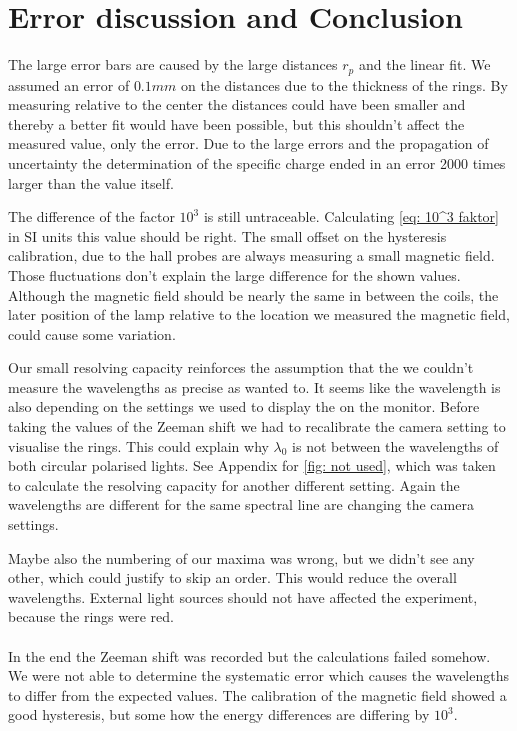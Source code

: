 \documentclass[]{article}
\begin{document}
\newpage
\section{Error discussion and Conclusion}
The large error bars are caused by the large distances $r_p$ and the linear fit. We assumed an error of $0.1mm$ on the distances due to the thickness of the rings. By measuring relative to the center the distances could have been smaller and thereby a better fit would have been possible, but this shouldn't affect the measured value, only the error. Due to the large errors and the propagation of uncertainty the determination of the specific charge ended in an error 2000 times larger than the value itself.

The difference of the factor $10^3$ is still untraceable. Calculating \autoref{eq: 10^3 faktor} in SI units this value should be right. The small offset on the hysteresis calibration, due to the hall probes are always measuring a small magnetic field. Those fluctuations don't explain the large difference for the shown values. Although the magnetic field should be nearly the same in between the coils, the later position of the lamp relative to the location we measured the magnetic field, could cause some variation.

Our small resolving capacity reinforces the assumption that the we couldn't measure the wavelengths as precise as wanted to. It seems like the wavelength is also depending on the settings we used to display the on the monitor. Before taking the values of the Zeeman shift we had to recalibrate the camera setting to visualise the rings. This could explain why $\lambda_0$ is not between the wavelengths of both circular polarised lights. See Appendix for \autoref{fig: not used}, which was taken to calculate the resolving capacity for another different setting. Again the wavelengths are different for the same spectral line are changing the camera settings.

Maybe also the numbering of our maxima was wrong, but we didn't see any other, which could justify to skip an order. This would reduce the overall wavelengths. External light sources should not have affected the experiment, because the rings were red.
\\ \\
In the end the Zeeman shift was recorded but the calculations failed somehow. We were not able to determine the systematic error which causes the wavelengths to differ from the expected values. The calibration of the magnetic field showed a good hysteresis, but some how the energy differences are differing by $10^3$. 
\end{document}

